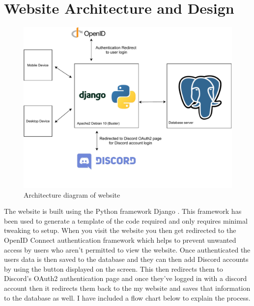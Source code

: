 \section{Website Architecture and Design}
\begin{figure}[H]
	\centering
	\includegraphics[width=1\linewidth]{Figures/Architecture-website}
	\caption{Architecture diagram of website}
	\label{fig:architecture-web}
\end{figure}

The website is built using the Python framework Django \cite{Django}. This framework has been used to generate a template of the code required and only requires minimal tweaking to setup. When you visit the website you then get redirected to the OpenID Connect \cite{OpenID} authentication framework which helps to prevent unwanted access by users who aren't permitted to view the website. Once authenticated the users data is then saved to the database and they can then add Discord accounts by using the button displayed on the screen. This then redirects them to Discord's OAuth2 authentication page and once they've logged in with a discord account then it redirects them back to the my website and saves that information to the database as well. I have included a flow chart below to explain the process.

